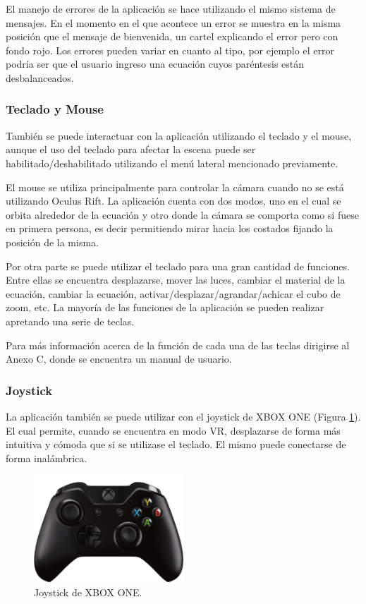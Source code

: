 \documentclass[12pt]{article}
\begin{document}
El manejo de errores de la aplicación se hace utilizando el mismo sistema de mensajes. En el momento en el que acontece un error se muestra en la misma posición que el mensaje de bienvenida, un cartel explicando el error pero con fondo rojo. Los errores pueden variar en cuanto al tipo, por ejemplo el error podría ser que el usuario ingreso una ecuación cuyos paréntesis están desbalanceados.
\subsubsection{Teclado y Mouse}
También se puede interactuar con la aplicación utilizando el teclado y el mouse, aunque el uso del teclado para afectar la escena puede ser habilitado/deshabilitado utilizando el menú lateral mencionado previamente.

El mouse se utiliza principalmente para controlar la cámara cuando no se está utilizando Oculus Rift. La aplicación cuenta con dos modos, uno en el cual se orbita alrededor de la ecuación y otro donde la cámara se comporta como si fuese en primera persona, es decir permitiendo mirar hacia los costados fijando la posición de la misma.

Por otra parte se puede utilizar el teclado para una gran cantidad de funciones. Entre ellas se encuentra desplazarse, mover las luces, cambiar el material de la ecuación, cambiar la ecuación, activar/desplazar/agrandar/achicar el cubo de zoom, etc. La mayoría de las funciones de la aplicación se pueden realizar apretando una serie de teclas.

Para más información acerca de la función de cada una de las teclas dirigirse al Anexo C, donde se encuentra un manual de usuario.


\subsubsection{Joystick}
La aplicación también se puede utilizar con el joystick de XBOX ONE (Figura \ref{xbox}). El cual permite, cuando se encuentra en modo VR, desplazarse de forma más intuitiva y cómoda que si se utilizase el teclado. El mismo puede conectarse de forma inalámbrica.\\
\begin{figure}[h!]
\includegraphics[width=0.5\textwidth,center]{joystickPosta.png}
\caption{Joystick de XBOX ONE.}
\label{xbox}
\end{figure}
\end{document}
